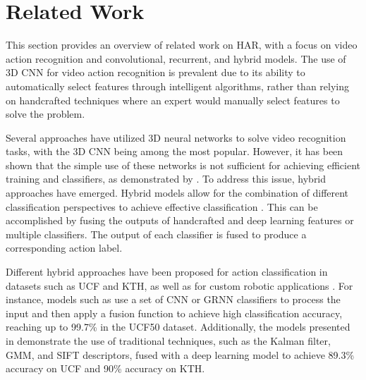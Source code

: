 \documentclass[mathematics,article,submit,pdftex,moreauthors]{Definitions/mdpi}
\begin{document}



\section{Related Work}

This section provides an overview of related work on HAR, with a focus on video action recognition and convolutional, recurrent, and hybrid models. The use of 3D CNN for video action recognition is prevalent due to its ability to automatically select features through intelligent algorithms, rather than relying on handcrafted techniques where an expert would manually select features to solve the problem. 

Several approaches have utilized 3D neural networks to solve video recognition tasks, with the 3D CNN \cite{978301225,8945731,diba2016efficient,10112975} being among the most popular. However, it has been shown that the simple use of these networks is not sufficient for achieving efficient training and classifiers, as demonstrated by \cite{978301225}. To address this issue, hybrid approaches have emerged. Hybrid models allow for the combination of different classification perspectives to achieve effective classification \cite{IJJINA2016936}. This can be accomplished by fusing the outputs of handcrafted and deep learning features or multiple classifiers. The output of each classifier is fused to produce a corresponding action label. 

Different hybrid approaches \cite{JAOUEDI2020447,IJJINA2016936,Dash2021} have been proposed for action classification in datasets such as UCF and KTH, as well as for custom robotic applications \cite{ZHANG2021102184}. For instance, models such as \cite{JAOUEDI2020447,IJJINA2016936} use a set of CNN or GRNN classifiers to process the input and then apply a fusion function to achieve high classification accuracy, reaching up to 99.7\% in the UCF50 dataset. Additionally, the models presented in \cite{IJJINA2016936,Dash2021} demonstrate the use of traditional techniques, such as the Kalman filter, GMM, and SIFT descriptors, fused with a deep learning model to achieve 89.3\% accuracy on UCF and 90\% accuracy on KTH.
\end{document}

